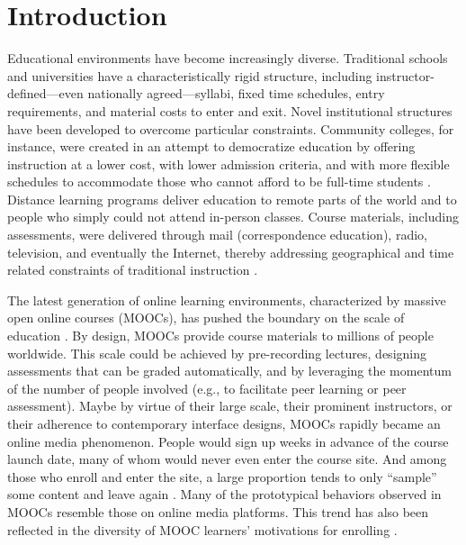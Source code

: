 \documentclass{sigchi}\usepackage[]{graphicx}\usepackage[]{color}
\begin{document}
\section{Introduction}

Educational environments have become increasingly diverse. Traditional schools and universities have a characteristically rigid structure, including instructor-defined---even nationally agreed---syllabi, fixed time schedules, entry requirements, and material costs to enter and exit. Novel institutional structures have been developed to overcome particular constraints. Community colleges, for instance, were created in an attempt to democratize education by offering instruction at a lower cost, with lower admission criteria, and with more flexible schedules to accommodate those who cannot afford to be full-time students \cite{goldrick2010challenges}. Distance learning programs deliver education to remote parts of the world and to people who simply could not attend in-person classes. Course materials, including assessments, were delivered through mail (correspondence education), radio, television, and eventually the Internet, thereby addressing geographical and time related constraints of traditional instruction \cite{moore1996distance}.

The latest generation of online learning environments, characterized by massive open online courses (MOOCs), has pushed the boundary on the scale of education \cite{waldrop2013campus}. By design, MOOCs provide course materials to millions of people worldwide. This scale could be achieved by pre-recording lectures, designing assessments that can be graded automatically, and by leveraging the momentum of the number of people involved (e.g., to facilitate peer learning or peer assessment). Maybe by virtue of their large scale, their prominent instructors, or their adherence to contemporary interface designs, MOOCs rapidly became an online media phenomenon. People would sign up weeks in advance of the course launch date, many of whom would never even enter the course site. And among those who enroll and enter the site, a large proportion tends to only ``sample'' some content and leave again \cite{kizilcec2013deconstructing}. Many of the prototypical behaviors observed in MOOCs \cite{kizilcec2013deconstructing,breslow2013studying} resemble those on online media platforms. This trend has also been reflected in the diversity of MOOC learners' motivations for enrolling \cite{kizilcec2015motivation}.
\end{document}
